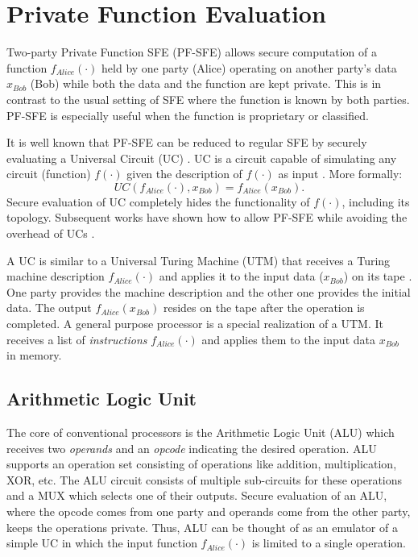 \chapter{Private Function Evaluation}\label{chap:secproc}
Two-party Private Function SFE (PF-SFE) allows secure computation of a function $f_{Alice}(\cdot)$ held by one party (Alice) operating on another party's data $x_{Bob}$ (Bob) while both the data and the function are kept private.
This is in contrast to the usual setting of SFE where the function is known by both parties.
PF-SFE is especially useful when the function is proprietary or classified.

It is well known that PF-SFE can be reduced to regular SFE by securely evaluating a Universal Circuit (UC) \cite{sander1999non}.
UC is a circuit capable of simulating any circuit (function) $f(\cdot)$ given the description of $f(\cdot)$ as input \cite{Valiant76,KS08UC}.
More formally:
$$UC(f_{Alice}(\cdot),x_{Bob}) = f_{Alice}(x_{Bob}).$$
Secure evaluation of UC completely hides the functionality of $f(\cdot)$, including its topology.
Subsequent works have shown how to allow PF-SFE while avoiding the overhead of UCs \cite{KatzM11, MohasselS13}.

A UC is similar to a Universal Turing Machine (UTM) \cite{turing1936computable,herken1995universal} that receives a Turing machine description $f_{Alice}(\cdot)$ and applies it to the input data ($x_{Bob}$) on its tape \cite{davis2001engines}.
One party provides the machine description and the other one provides the initial data.
The output $f_{Alice}(x_{Bob})$ resides on the tape after the operation is completed.
A general purpose processor is a special realization of a UTM.
It receives a list of \emph{instructions} $f_{Alice}(\cdot)$ and applies them to the input data $x_{Bob}$ in memory.

\section{Arithmetic Logic Unit}
The core of conventional processors is the Arithmetic Logic Unit (ALU) which receives two \emph{operands} and an \emph{opcode} indicating the desired operation.
ALU supports an operation set consisting of operations like addition, multiplication, XOR, etc.
The ALU circuit consists of multiple sub-circuits for these operations and a MUX which selects one of their outputs.
Secure evaluation of an ALU, where the opcode comes from one party and operands come from the other party, keeps the operations private.
Thus, ALU can be thought of as an emulator of a simple UC in which the input function $f_{Alice}(\cdot)$ is limited to a single operation.

